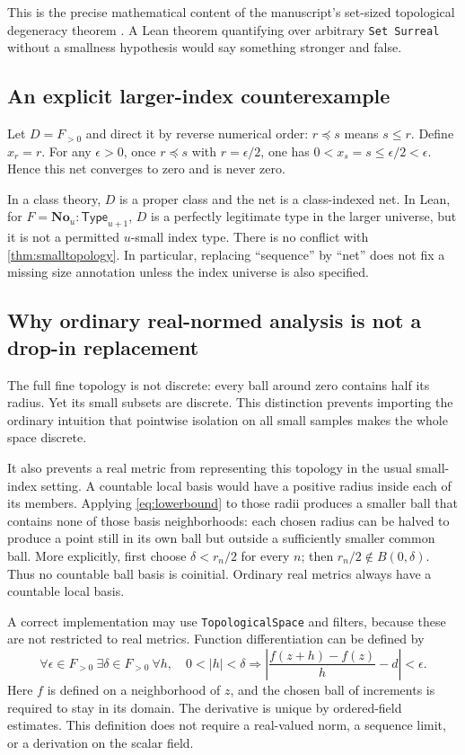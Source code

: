 \documentclass[11pt,letterpaper]{article}
\numberwithin{equation}{section}
\theoremstyle{definition}
\theoremstyle{remark}
\newcommand{\No}{\mathbf{No}}
\newcommand{\Type}{\mathsf{Type}}
\begin{document}
This is the precise mathematical content of the manuscript's set-sized topological degeneracy theorem \cite[\S3]{AnalysisSource}. A Lean theorem quantifying over arbitrary \texttt{Set Surreal} without a smallness hypothesis would say something stronger and false.

\subsection{An explicit larger-index counterexample}
Let $D=F_{>0}$ and direct it by reverse numerical order: $r\preceq s$ means $s\le r$. Define $x_r=r$. For any $\epsilon>0$, once $r\preceq s$ with $r=\epsilon/2$, one has $0<x_s=s\le\epsilon/2<\epsilon$. Hence this net converges to zero and is never zero.

In a class theory, $D$ is a proper class and the net is a class-indexed net. In Lean, for $F=\No_u:\Type_{u+1}$, $D$ is a perfectly legitimate type in the larger universe, but it is not a permitted $u$-small index type. There is no conflict with \cref{thm:smalltopology}. In particular, replacing ``sequence'' by ``net'' does not fix a missing size annotation unless the index universe is also specified.

\subsection{Why ordinary real-normed analysis is not a drop-in replacement}
The full fine topology is not discrete: every ball around zero contains half its radius. Yet its small subsets are discrete. This distinction prevents importing the ordinary intuition that pointwise isolation on all small samples makes the whole space discrete.

It also prevents a real metric from representing this topology in the usual small-index setting. A countable local basis would have a positive radius inside each of its members. Applying \eqref{eq:lowerbound} to those radii produces a smaller ball that contains none of those basis neighborhoods: each chosen radius can be halved to produce a point still in its own ball but outside a sufficiently smaller common ball. More explicitly, first choose $\delta<r_n/2$ for every $n$; then $r_n/2\notin B(0,\delta)$. Thus no countable ball basis is coinitial. Ordinary real metrics always have a countable local basis.

A correct implementation may use \texttt{TopologicalSpace} and filters, because these are not restricted to real metrics. Function differentiation can be defined by
\begin{equation}\label{eq:derivative}
 \forall\epsilon\in F_{>0}\ \exists\delta\in F_{>0}\ \forall h,
 \quad 0<|h|<\delta\Rightarrow
 \left|\frac{f(z+h)-f(z)}h-d\right|<\epsilon.
\end{equation}
Here $f$ is defined on a neighborhood of $z$, and the chosen ball of increments is required to stay in its domain. The derivative is unique by ordered-field estimates. This definition does not require a real-valued norm, a sequence limit, or a derivation on the scalar field.
\end{document}
